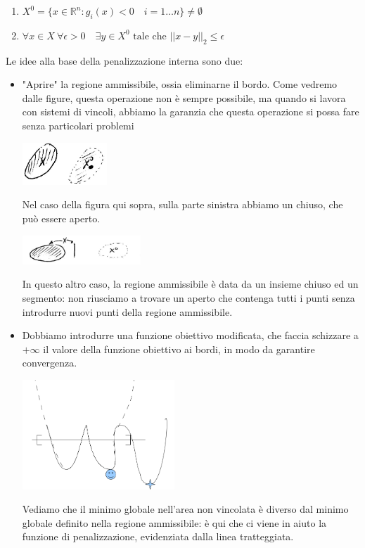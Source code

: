 \begin{enumerate}
\item
 $X^{0}= \{ x \in \mathbb{R}^{n}: g_i(x) < 0 \quad i = 1 \ldots n \}
\neq \emptyset$

\item $\forall x \in X ~ \forall  \epsilon > 0
\quad \exists y \in X^{0} \text{ tale che } ||x - y||_2 \leq \epsilon$
\end{enumerate}
Le idee alla base della penalizzazione interna sono due:
\begin{itemize}
 \item "Aprire" la regione ammissibile, ossia eliminarne il bordo.
       Come vedremo dalle figure, questa operazione non \`e sempre possibile,
       ma quando si lavora con sistemi di vincoli, abbiamo la garanzia
       che questa operazione si possa fare senza particolari problemi
 \begin{center}
    \includegraphics[width=0.25\textwidth]{imgs/ottvinc06.png}
  \end{center}
  Nel caso della figura qui sopra, sulla parte sinistra abbiamo un chiuso,
  che pu\`o essere aperto.
  \begin{center}
    \includegraphics[width=0.35\textwidth]{imgs/ottvinc07.png}
  \end{center}
  In questo altro caso, la regione ammissibile \`e data da un insieme
  chiuso ed un segmento: non riusciamo a trovare un aperto che contenga
  tutti i punti senza introdurre nuovi punti della regione ammissibile.
 
 \item Dobbiamo introdurre una funzione obiettivo modificata, 
   che faccia schizzare a $+\infty$ il valore della funzione obiettivo
   ai bordi, in modo da garantire convergenza.
  \begin{center}
    \includegraphics[width=0.45\textwidth]{imgs/penint.png}
  \end{center}
  Vediamo che il minimo globale nell'area non vincolata \`e diverso
  dal minimo globale definito nella regione ammissibile: \`e qui
  che ci viene in aiuto la funzione di penalizzazione, evidenziata
  dalla linea tratteggiata.

\end{itemize}

